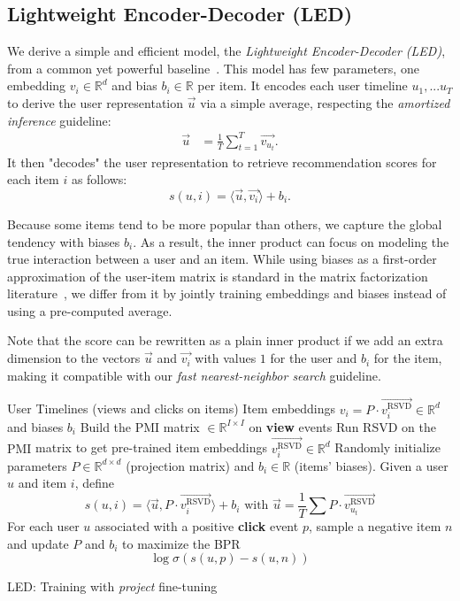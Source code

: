 \documentclass[sigconf]{acmart}
\begin{document}
\subsection{Lightweight Encoder-Decoder (LED)}
\label{subsec:LED}

We derive a simple and efficient model, the \emph{Lightweight Encoder-Decoder (LED)}, from a common yet powerful baseline~\cite{starspace-facebook}. This model has few parameters, one embedding $ v_i \in \mathbb{R}^d $ and bias $ b_i \in \mathbb{R} $ per item. It encodes each user timeline $ u_1, ... u_T $ to derive the user representation $ \vec{u} $ via a simple average, respecting the \emph{amortized inference} guideline:
\begin{align*}
    \overrightarrow{u} &= \frac{1}{T}\sum_{t=1}^{T} \overrightarrow{v_{u_t}}.
\end{align*}
It then "decodes" the user representation to retrieve recommendation scores for each item $ i $ as follows:
$$
s(u,i) = \langle  \overrightarrow{u},  \overrightarrow{v_i} \rangle + b_i.
$$

Because some items tend to be more popular than others, we capture the global tendency with biases $ b_i $. As a result, the inner product can focus on modeling the true interaction between a user and an item. While using biases as a first-order approximation of the user-item matrix is standard in the matrix factorization literature~\cite{koren,paterek}, we differ from it by jointly training embeddings and biases instead of using a pre-computed average.

Note that the score can be rewritten as a plain inner product if we add an extra dimension to the vectors $ \vec{u} $ and $ \overrightarrow{v_i} $ with values $ 1 $ for the user and $ b_i $ for the item, making it compatible with our \emph{fast nearest-neighbor search} guideline.

\begin{algorithm}[tb]
  \begin{algorithmic}[1]
    \Input User Timelines (views and clicks on items)
    \Output Item embeddings $ v_i = P \cdot \overrightarrow{v_i^{\text{RSVD}}} \in \mathbb{R}^d $ and biases $ b_i $
    \State Build the PMI matrix $ \in \mathbb{R}^{I \times I} $ on \textbf{view} events
    \State Run RSVD on the $ \text{PMI} $ matrix to get pre-trained item embeddings $ \overrightarrow{v_i^{\text{RSVD}}} \in \mathbb{R}^d $
    \State Randomly initialize parameters $ P \in \mathbb{R}^{d \times d} $ (projection matrix) and $ b_i \in \mathbb{R} $ (items' biases). Given a user $ u $ and item $ i $, define
    $$ s(u, i) = \langle \vec{u} , P \cdot \overrightarrow{v_i^{\text{RSVD}}} \rangle  + b_i \text{ \ with \ } \vec{u} = \frac{1}{T} \sum P \cdot \overrightarrow{v_{u_t}^{\text{RSVD}}} $$
\State For each user $ u $ associated with a positive \textbf{click} event $ p $, sample a negative item $ n $ and update $ P $ and $ b_i $ to maximize the BPR
        $$ \log \sigma \left( s(u, p) - s(u, n) \right)$$
    
\end{algorithmic}
 \caption{LED: Training with \emph{project} fine-tuning}
 \label{alg:led-training-procedure}
\end{algorithm}
\end{document}
